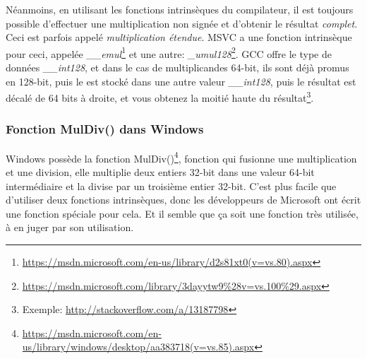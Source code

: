 Néanmoins, en utilisant les fonctions intrinsèques du compilateur, il est toujours
possible d'effectuer une multiplication non signée et d'obtenir le résultat \emph{complet}.
Ceci est parfois appelé \emph{multiplication étendue}.
MSVC a une fonction intrinsèque pour ceci, appelée \emph{\_\_emul}\footnote{\url{https://msdn.microsoft.com/en-us/library/d2s81xt0(v=vs.80).aspx}}
et une autre: \emph{\_umul128}\footnote{\url{https://msdn.microsoft.com/library/3dayytw9%28v=vs.100%29.aspx}}.
GCC offre le type de données \emph{\_\_int128}, et dans le cas de multiplicandes 64-bit,
ils sont déjà promus en 128-bit, puis le  est stocké dans
une autre valeur \emph{\_\_int128}, puis le résultat est décalé de 64 bits à droite,
et vous obtenez la moitié haute du résultat\footnote{Exemple: \url{http://stackoverflow.com/a/13187798}}.

\subsubsection{Fonction MulDiv() dans Windows}

Windows possède la fonction MulDiv()\footnote{\url{https://msdn.microsoft.com/en-us/library/windows/desktop/aa383718(v=vs.85).aspx}},
fonction qui fusionne une multiplication et une division, elle multiplie deux entiers
32-bit dans une valeur 64-bit intermédiaire et la divise par un troisième entier 32-bit.
C'est plus facile que d'utiliser deux fonctions intrinsèques, donc les développeurs
de Microsoft ont écrit une fonction spéciale pour cela.
Et il semble que ça soit une fonction très utilisée, à en juger par son utilisation.

